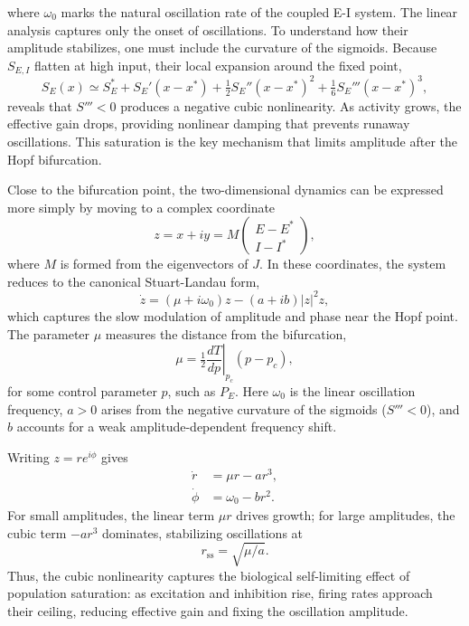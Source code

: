 where $\omega_0$ marks the natural oscillation rate of the coupled E-I system. The linear analysis captures only the onset of oscillations. To understand how their amplitude stabilizes, one must include the curvature of the sigmoids. Because $S_{E,I}$ flatten at high input, their local expansion around the fixed point,
\begin{equation}
S_E(x) \simeq S_E^* + S_E'(x-x^*) + \tfrac{1}{2}S_E''(x-x^*)^2 + \tfrac{1}{6}S_E'''(x-x^*)^3,
\end{equation}
reveals that $S''' < 0$ produces a negative cubic nonlinearity.   As activity grows, the effective gain drops, providing nonlinear damping that prevents runaway oscillations.   This saturation is the key mechanism that limits amplitude after the Hopf bifurcation.

Close to the bifurcation point, the two-dimensional dynamics can be expressed more simply by moving to a complex coordinate
\begin{equation}
z = x + i y = M\begin{pmatrix}E - E^* \\ I - I^*\end{pmatrix},
\end{equation}
where $M$ is formed from the eigenvectors of $J$.  
In these coordinates, the system reduces to the canonical Stuart-Landau form,
\begin{equation}
\dot{z} = (\mu + i\omega_0)z - (a + ib)|z|^2z,
\end{equation}
which captures the slow modulation of amplitude and phase near the Hopf point.  
The parameter $\mu$ measures the distance from the bifurcation,
\begin{equation}
\mu = \tfrac{1}{2}\left.\frac{dT}{dp}\right|_{p_c}(p - p_c),
\end{equation}
for some control parameter $p$, such as $P_E$.  
Here $\omega_0$ is the linear oscillation frequency, $a>0$ arises from the negative curvature of the sigmoids ($S'''<0$), and $b$ accounts for a weak amplitude-dependent frequency shift.

Writing $z = r e^{i\phi}$ gives
\begin{align}
\dot{r} &= \mu r - a r^3,\\
\dot{\phi} &= \omega_0 - b r^2.
\end{align}
For small amplitudes, the linear term $\mu r$ drives growth; for large amplitudes, the cubic term $-a r^3$ dominates, stabilizing oscillations at
\begin{equation}
r_{\mathrm{ss}} = \sqrt{\mu/a}.
\end{equation}
Thus, the cubic nonlinearity captures the biological self-limiting effect of population saturation: as excitation and inhibition rise, firing rates approach their ceiling, reducing effective gain and fixing the oscillation amplitude.


